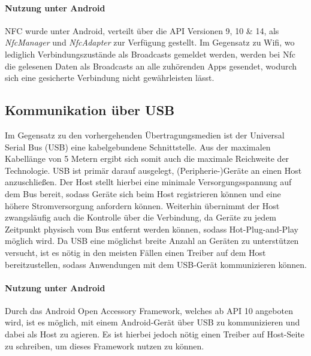         \paragraph{Nutzung unter Android}
        NFC wurde unter Android, verteilt über die API Versionen 9, 10 \& 14,  als {\it NfcManager} und {\it NfcAdapter} zur Verfügung gestellt. Im Gegensatz zu Wifi, wo lediglich Verbindungszustände als Broadcasts gemeldet werden, werden bei Nfc die gelesenen Daten als Broadcasts an alle zuhörenden Apps gesendet, wodurch sich eine gesicherte Verbindung nicht gewährleisten lässt.

    \subsection{Kommunikation über USB}
        Im Gegensatz zu den vorhergehenden Übertragungsmedien ist der Universal Serial Bus (USB) eine kabelgebundene Schnittstelle. Aus der maximalen Kabellänge von 5 Metern
        ergibt sich somit auch die maximale Reichweite der Technologie. USB ist primär darauf ausgelegt, (Peripherie-)Geräte an einen Host anzuschließen.
        Der Host stellt hierbei eine minimale Versorgungsspannung auf dem Bus bereit, sodass Geräte sich beim Host registrieren können und eine höhere Stromversorgung anfordern können.
        Weiterhin übernimmt der Host zwangsläufig auch die Kontrolle über die Verbindung, da Geräte zu jedem Zeitpunkt physisch vom Bus entfernt werden können, sodass Hot-Plug-and-Play
        möglich wird.\cite[S.21-24]{Kelm}
        Da USB eine möglichst breite Anzahl an Geräten zu unterstützen versucht, ist es nötig in den meisten Fällen einen Treiber auf dem Host bereitzustellen, sodass Anwendungen mit dem USB-Gerät kommunizieren können.\cite[S.197]{Kelm}

        \paragraph{Nutzung unter Android}
        Durch das Android Open Accessory Framework, welches ab API 10 angeboten wird, ist es möglich, mit einem Android-Gerät über USB zu kommunizieren und dabei als Host zu agieren. Es ist hierbei jedoch nötig einen Treiber auf Host-Seite zu schreiben, um dieses Framework nutzen zu können.\cite{AOA}


